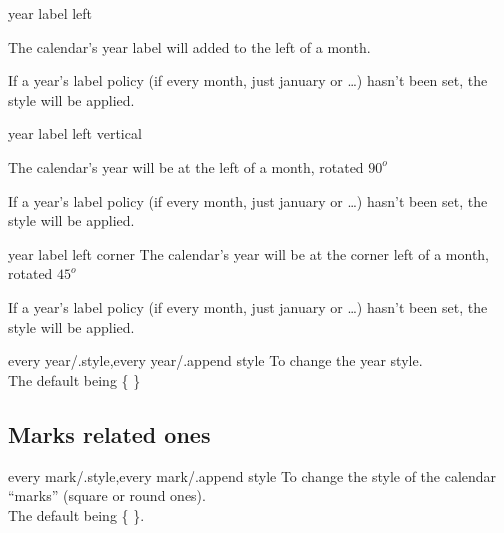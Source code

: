 \documentclass{article}
\begin{document}
\begin{codedescribe}[key]{year label left}
\begin{codesyntax}%
\end{codesyntax}
The calendar's year label will added to the left of a month.
\end{codedescribe}

\begin{tsremark} 
If a year's label policy (if every month, just january or \ldots) hasn't been set, the style  will be applied.
\end{tsremark}

\begin{codedescribe}[key]{year label left vertical}
\begin{codesyntax}%
\end{codesyntax}
The calendar's year will be at the left of a month, rotated $90^o$
\end{codedescribe}

\begin{tsremark} 
If a year's label policy (if every month, just january or \ldots) hasn't been set, the style  will be applied.
\end{tsremark}

\begin{codedescribe}[key]{year label left corner}
The calendar's year will be at the corner left of a month, rotated $45^o$
\end{codedescribe}

\begin{tsremark} 
If a year's label policy (if every month, just january or \ldots) hasn't been set, the style  will be applied.
\end{tsremark}


\begin{codedescribe}[key]{every year/.style,every year/.append style}
To change the year style.\\ The default being \{  \}\\
\end{codedescribe}

\subsection{Marks related ones}
\begin{codedescribe}[key]{every mark/.style,every mark/.append style}
To change the style of the calendar ``marks'' (square or round ones).\\ The default being \{  \}.
\end{codedescribe}
\end{document}
